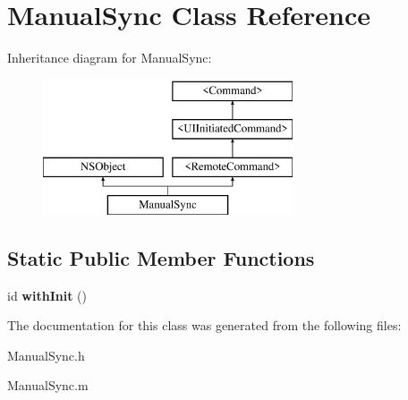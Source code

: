 \hypertarget{interface_manual_sync}{
\section{\-Manual\-Sync \-Class \-Reference}
\label{interface_manual_sync}
}
\-Inheritance diagram for \-Manual\-Sync\-:\begin{figure}[H]
\begin{center}
\leavevmode
\includegraphics[height=4.000000cm]{interface_manual_sync}
\end{center}
\end{figure}
\subsection*{\-Static \-Public \-Member \-Functions}
\begin{DoxyCompactItemize}
\item 
\hypertarget{interface_manual_sync_aa24f3e82c1f727627873dfd553d48790}{
id {\bfseries with\-Init} ()}
\label{interface_manual_sync_aa24f3e82c1f727627873dfd553d48790}

\end{DoxyCompactItemize}


\-The documentation for this class was generated from the following files\-:\begin{DoxyCompactItemize}
\item 
\-Manual\-Sync.\-h\item 
\-Manual\-Sync.\-m\end{DoxyCompactItemize}
